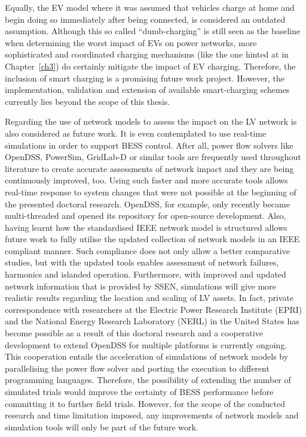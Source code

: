 Equally, the EV model where it was assumed that vehicles charge at home and begin doing so immediately after being connected, is considered an outdated assumption.
Although this so called ``dumb-charging'' is still seen as the baseline when determining the worst impact of EVs on power networks, more sophisticated and coordinated charging mechanisms (like the one hinted at in Chapter~\ref{ch3}) do certainly mitigate the impact of EV charging.
Therefore, the inclusion of smart charging is a promising future work project.
However, the implementation, validation and extension of available smart-charging schemes currently lies beyond the scope of this thesis.

Regarding the use of network models to assess the impact on the LV network is also considered as future work.
It is even contemplated to use real-time simulations in order to support BESS control.
After all, power flow solvers like OpenDSS, PowerSim, GridLab-D or similar tools are frequently used throughout literature to create accurate assessments of network impact and they are being continuously improved, too.
Using such faster and more accurate tools allows real-time response to system changes that were not possible at the beginning of the presented doctoral research.
OpenDSS, for example, only recently became multi-threaded and opened its repository for open-source development.
Also, having learnt how the standardised IEEE network model is structured allows future work to fully utilise the updated collection of network models in an IEEE compliant manner.
Such compliance does not only allow a better comparative studies, but with the updated tools enables assessment of network failures, harmonics and islanded operation.
Furthermore, with improved and updated network information that is provided by SSEN, simulations will give more realistic results regarding the location and scaling of LV assets.
In fact, private correspondence with researchers at the Electric Power Research Institute (EPRI) and the National Energy Research Laboratory (NERL) in the United States has become possible as a result of this doctoral research and a cooperative development to extend OpenDSS for multiple platforms is currently ongoing.
This cooperation entails the acceleration of simulations of network models by parallelising the power flow solver and porting the execution to different programming languages.
Therefore, the possibility of extending the number of simulated trials would improve the certainty of BESS performance before committing it to further field trials.
However, for the scope of the conducted research and time limitation imposed, any improvements of network models and simulation tools will only be part of the future work.

